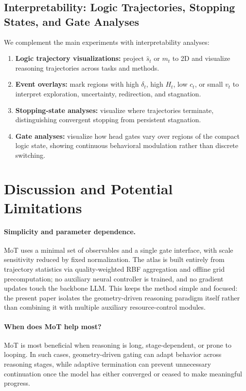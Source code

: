 \documentclass{article}
\begin{document}
\subsection{Interpretability: Logic Trajectories, Stopping States, and Gate Analyses}
We complement the main experiments with interpretability analyses:
\begin{enumerate}[leftmargin=1.3em, itemsep=0.2em]
    \item \textbf{Logic trajectory visualizations:} project $\hat s_t$ or $m_t$ to 2D and visualize reasoning trajectories across tasks and methods.
    \item \textbf{Event overlays:} mark regions with high $\delta_t$, high $H_t$, low $c_t$, or small $v_t$ to interpret exploration, uncertainty, redirection, and stagnation.
    \item \textbf{Stopping-state analyses:} visualize where trajectories terminate, distinguishing convergent stopping from persistent stagnation.
    \item \textbf{Gate analyses:} visualize how head gates vary over regions of the compact logic state, showing continuous behavioral modulation rather than discrete switching.
\end{enumerate}


\section{Discussion and Potential Limitations}
\label{sec:discussion}

\paragraph{Simplicity and parameter dependence.}
MoT uses a minimal set of observables and a single gate interface, with scale sensitivity reduced by fixed normalization. The atlas is built entirely from trajectory statistics via quality-weighted RBF aggregation and offline grid precomputation; no auxiliary neural controller is trained, and no gradient updates touch the backbone LLM. This keeps the method simple and focused: the present paper isolates the geometry-driven reasoning paradigm itself rather than combining it with multiple auxiliary resource-control modules.

\paragraph{When does MoT help most?}
MoT is most beneficial when reasoning is long, stage-dependent, or prone to looping. In such cases, geometry-driven gating can adapt behavior across reasoning stages, while adaptive termination can prevent unnecessary continuation once the model has either converged or ceased to make meaningful progress.
\end{document}
